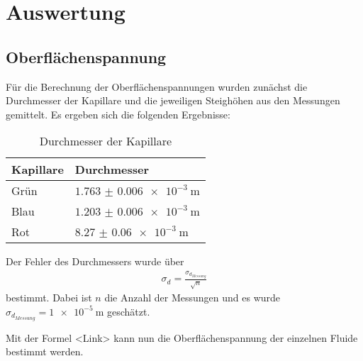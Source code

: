 \section{Auswertung}
\subsection{Oberflächenspannung}
Für die Berechnung der Oberflächenspannungen wurden zunächst die Durchmesser der Kapillare und die jeweiligen Steighöhen aus den Messungen gemittelt. Es ergeben sich die folgenden Ergebnisse:
\begin{table}[!htbp]
\centering
	\begin{tabular}{l|l}
		\hline
		Kapillare & Durchmesser \\
		\hline \hline
		Grün  & $\SI{1.763(6)e-3}{\m}$  \\
		Blau & $\SI{1.203(6)e-3}{\m}$  \\
		Rot & $\SI{8.27(6)e-3}{\m}$ \\
		\hline
	\end{tabular}
	\caption{Durchmesser der Kapillare}
	\label{tab:1}
\end{table}
\newline
Der Fehler des Durchmessers wurde über
\begin{align*}
\sigma_d = \frac{\sigma_{d_{Messung}}}{\sqrt{n}}
\end{align*}
bestimmt. Dabei ist $n$ die Anzahl der Messungen und es wurde $\sigma_{d_{Messung}} = \SI{1e-5}{\m}$ geschätzt.

Mit der Formel <Link> kann nun die Oberflächenspannung der einzelnen Fluide bestimmt werden. 


